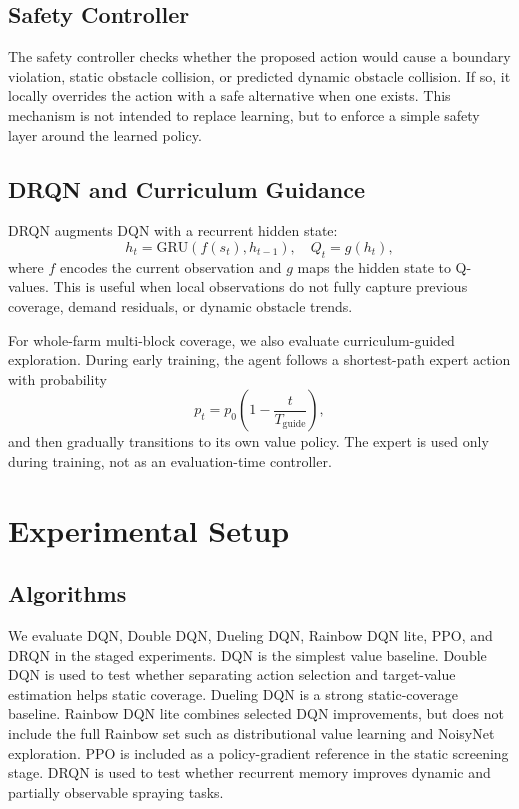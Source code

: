 \documentclass[conference,10pt]{IEEEtran}
\begin{document}
\subsection{Safety Controller}
The safety controller checks whether the proposed action would cause a boundary violation, static obstacle collision, or predicted dynamic obstacle collision. If so, it locally overrides the action with a safe alternative when one exists. This mechanism is not intended to replace learning, but to enforce a simple safety layer around the learned policy.

\subsection{DRQN and Curriculum Guidance}
DRQN augments DQN with a recurrent hidden state:
\begin{equation}
h_t = \mathrm{GRU}(f(s_t),h_{t-1}),\quad Q_t=g(h_t),
\end{equation}
where $f$ encodes the current observation and $g$ maps the hidden state to Q-values. This is useful when local observations do not fully capture previous coverage, demand residuals, or dynamic obstacle trends.

For whole-farm multi-block coverage, we also evaluate curriculum-guided exploration. During early training, the agent follows a shortest-path expert action with probability
\begin{equation}
p_t = p_0\left(1-\frac{t}{T_{\mathrm{guide}}}\right),
\end{equation}
and then gradually transitions to its own value policy. The expert is used only during training, not as an evaluation-time controller.

\section{Experimental Setup}
\subsection{Algorithms}
We evaluate DQN, Double DQN, Dueling DQN, Rainbow DQN lite, PPO, and DRQN in the staged experiments. DQN is the simplest value baseline. Double DQN is used to test whether separating action selection and target-value estimation helps static coverage. Dueling DQN is a strong static-coverage baseline. Rainbow DQN lite combines selected DQN improvements, but does not include the full Rainbow set such as distributional value learning and NoisyNet exploration. PPO is included as a policy-gradient reference in the static screening stage. DRQN is used to test whether recurrent memory improves dynamic and partially observable spraying tasks.
\end{document}
